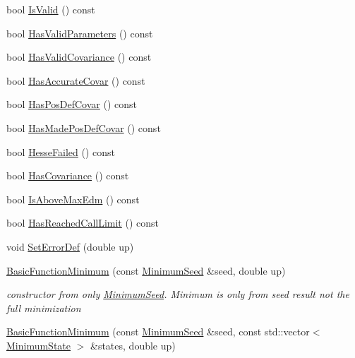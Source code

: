 \begin{DoxyCompactItemize}
bool \mbox{\hyperlink{classROOT_1_1Minuit2_1_1BasicFunctionMinimum_a644f34dabb94b0b5bdc8f7b8bfa7ae4b}{Is\+Valid}} () const
\item 
bool \mbox{\hyperlink{classROOT_1_1Minuit2_1_1BasicFunctionMinimum_a91fedd04974dd5d27981eb758405670f}{Has\+Valid\+Parameters}} () const
\item 
bool \mbox{\hyperlink{classROOT_1_1Minuit2_1_1BasicFunctionMinimum_a2bf14deac281ae646e88a2fa6d0b5012}{Has\+Valid\+Covariance}} () const
\item 
bool \mbox{\hyperlink{classROOT_1_1Minuit2_1_1BasicFunctionMinimum_acc1e5d50ec4abe632af93c5dcebd9c0e}{Has\+Accurate\+Covar}} () const
\item 
bool \mbox{\hyperlink{classROOT_1_1Minuit2_1_1BasicFunctionMinimum_a82e819b720ca93301fdea10fc10af791}{Has\+Pos\+Def\+Covar}} () const
\item 
bool \mbox{\hyperlink{classROOT_1_1Minuit2_1_1BasicFunctionMinimum_a57562fcd9f78a8e4f9a425c8f80f1d83}{Has\+Made\+Pos\+Def\+Covar}} () const
\item 
bool \mbox{\hyperlink{classROOT_1_1Minuit2_1_1BasicFunctionMinimum_a8bcb47393d7e39ec1c8fda42974d092f}{Hesse\+Failed}} () const
\item 
bool \mbox{\hyperlink{classROOT_1_1Minuit2_1_1BasicFunctionMinimum_ac876224368add09ceab711d3515fd959}{Has\+Covariance}} () const
\item 
bool \mbox{\hyperlink{classROOT_1_1Minuit2_1_1BasicFunctionMinimum_a6c37206680e19443048e8b398ef5ced8}{Is\+Above\+Max\+Edm}} () const
\item 
bool \mbox{\hyperlink{classROOT_1_1Minuit2_1_1BasicFunctionMinimum_ab26a12c388b15f056c9effa0abcd7639}{Has\+Reached\+Call\+Limit}} () const
\item 
void \mbox{\hyperlink{classROOT_1_1Minuit2_1_1BasicFunctionMinimum_ae89163fbfaccda743a6ca8d3add896dc}{Set\+Error\+Def}} (double up)
\item 
\mbox{\hyperlink{classROOT_1_1Minuit2_1_1BasicFunctionMinimum_a7482d18115a4dc6cd3a0690074c7bbb7}{Basic\+Function\+Minimum}} (const \mbox{\hyperlink{classROOT_1_1Minuit2_1_1MinimumSeed}{Minimum\+Seed}} \&seed, double up)
\begin{DoxyCompactList}\small\item\em constructor from only \mbox{\hyperlink{classROOT_1_1Minuit2_1_1MinimumSeed}{Minimum\+Seed}}. Minimum is only from seed result not the full minimization \end{DoxyCompactList}\item 
\mbox{\hyperlink{classROOT_1_1Minuit2_1_1BasicFunctionMinimum_a8a2f91243b896e3fe682c19ccd57a9bc}{Basic\+Function\+Minimum}} (const \mbox{\hyperlink{classROOT_1_1Minuit2_1_1MinimumSeed}{Minimum\+Seed}} \&seed, const std\+::vector$<$ \mbox{\hyperlink{classROOT_1_1Minuit2_1_1MinimumState}{Minimum\+State}} $>$ \&states, double up)

\end{DoxyCompactItemize}
